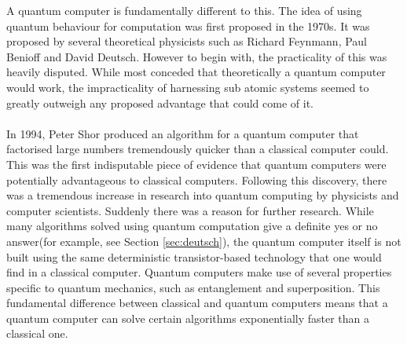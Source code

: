 \documentclass[12pt]{report}
\begin{document}
A quantum computer is fundamentally different to this.
The idea of using quantum behaviour for computation was first proposed in the 1970s. It was proposed by several theoretical physicists such as Richard Feynmann, Paul Benioff and David Deutsch\cite{4}.
However to begin with, the practicality of this was heavily disputed. 
While most conceded that theoretically a quantum computer would work, the impracticality of harnessing sub atomic systems seemed to greatly outweigh any proposed advantage that could come of it. \\ \\
In 1994, Peter Shor produced an algorithm for a quantum computer that factorised large numbers tremendously quicker than a classical computer could\cite{5}. This was the first indisputable piece of evidence that quantum computers were potentially advantageous to classical computers. Following this discovery, there was a tremendous increase in research into quantum computing by physicists and computer scientists. Suddenly there was a reason for further research.
While many algorithms solved using quantum computation give a definite yes or no answer(for example, see Section \ref{sec:deutsch}), the quantum computer itself is not built using the same deterministic transistor-based technology that one would find in a classical computer. Quantum computers make use of several properties specific to quantum mechanics, such as entanglement and superposition.
This fundamental difference between classical and quantum computers means that a quantum computer can solve certain algorithms exponentially faster than a classical one.
\end{document}
